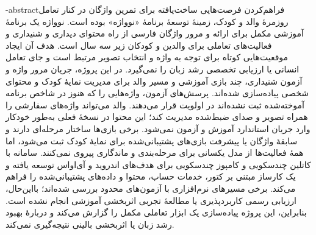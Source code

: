 \fa-abstract{فراهم‌کردن فرصت‌هایی ساخت‌یافته برای تمرین واژگان در کنار تعامل روزمرهٔ والد و کودک، زمینهٔ توسعهٔ برنامهٔ «نوواژه» بوده است. نوواژه یک برنامهٔ آموزشی مکمل برای ارائه و مرور واژگان فارسی از راه محتوای دیداری و شنیداری و فعالیت‌های تعاملی برای والدین و کودکان زیر سه سال است. هدف آن ایجاد موقعیت‌هایی کوتاه برای توجه به واژه و انتخاب تصویر مرتبط است و جای تعامل انسانی یا ارزیابی تخصصی رشد زبان را نمی‌گیرد. در این پروژه، جریان مرور واژه و آزمون شنیداری، چند بازی آموزشی و مسیر والد برای مدیریت نمایهٔ کودک و محتوای شخصی پیاده‌سازی شده‌اند. پرسش‌های آزمون، واژه‌هایی را که هنوز در شاخص برنامه آموخته‌شده ثبت نشده‌اند در اولویت قرار می‌دهند. والد می‌تواند واژه‌های سفارشی را همراه تصویر و صدای ضبط‌شده مدیریت کند؛ این محتوا در نسخهٔ فعلی به‌طور خودکار وارد جریان استاندارد آموزش و آزمون نمی‌شود. برخی بازی‌ها ساختار مرحله‌ای دارند و سابقهٔ واژگان یا پیشرفت بازی‌های پشتیبانی‌شده برای نمایهٔ کودک ثبت می‌شود، اما همهٔ فعالیت‌ها از مدل یکسانی برای مرحله‌بندی و ماندگاری پیروی نمی‌کنند. سامانه با کاتلین چندسکویی و کامپوز چندسکویی برای هدف‌های اندروید و آی‌اواس توسعه یافته و یک کارساز مبتنی بر کتور، خدمات حساب، محتوا و داده‌های پشتیبانی‌شده را فراهم می‌کند. برخی مسیرهای نرم‌افزاری با آزمون‌های محدود بررسی شده‌اند؛ بااین‌حال، ارزیابی رسمی کاربردپذیری یا مطالعهٔ تجربی اثربخشی آموزشی انجام نشده است. بنابراین، این پروژه پیاده‌سازی یک ابزار تعاملی مکمل را گزارش می‌کند و دربارهٔ بهبود رشد زبان یا اثربخشی بالینی نتیجه‌گیری نمی‌کند.}


\abstractPage

\newpage\clearpage
